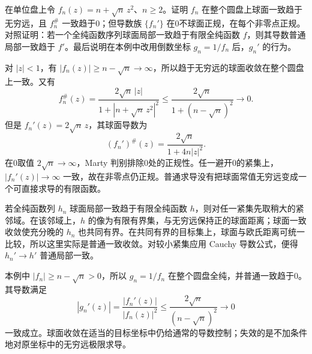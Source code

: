 \begin{exercise}[球面正规性不随求导保持]\label{b3:ex:14-8}
在单位盘上令 \(f_n(z)=n+\sqrt n\,z^2\)、\(n\ge2\)。证明 \(f_n\) 在整个圆盘上球面一致趋于无穷远，且 \(f_n^\#\) 一致趋于0；但导数族 \(\{f_n'\}\) 在0不球面正规，在每个非零点正规。对照证明：若一个全纯函数序列球面局部一致趋于有限全纯函数 \(f\)，则其导数普通局部一致趋于 \(f'\)。最后说明在本例中改用倒数坐标 \(g_n=1/f_n\) 后，\(g_n'\) 的行为。
\end{exercise}
\begin{solution}
对 \(|z|<1\)，有 \(|f_n(z)|\ge n-\sqrt n\rightarrow\infty\)，所以趋于无穷远的球面收敛在整个圆盘上一致。又有
\[
 f_n^\#(z)=\frac{2\sqrt n\,|z|}{1+|n+\sqrt n\,z^2|^2}
 \le\frac{2\sqrt n}{1+(n-\sqrt n)^2}\longrightarrow0.
\]
但是 \(f_n'(z)=2\sqrt n\,z\)，其球面导数为
\[
 (f_n')^\#(z)=\frac{2\sqrt n}{1+4n|z|^2}.
\]
在0取值 \(2\sqrt n\rightarrow\infty\)，Marty 判别排除0处的正规性。任一避开0的紧集上，\(|f_n'(z)|\rightarrow\infty\) 一致，故在非零点仍正规。普通求导没有把球面常值无穷远变成一个可直接求导的有限函数。

若全纯函数列 \(h_n\) 球面局部一致趋于有限全纯函数 \(h\)，则对任一紧集先取稍大的紧邻域。在该邻域上，\(h\) 的像为有限有界集，与无穷远保持正的球面距离；球面一致收敛使充分晚的 \(h_n\) 也共同有界。在共同有界的目标集上，球面与欧氏距离可统一比较，所以这里实际是普通一致收敛。对较小紧集应用 Cauchy 导数公式，便得 \(h_n'\rightarrow h'\) 普通局部一致。

本例中 \(|f_n|\ge n-\sqrt n>0\)，所以 \(g_n=1/f_n\) 在整个圆盘全纯，并普通一致趋于0。其导数满足
\[
 |g_n'(z)|=\frac{|f_n'(z)|}{|f_n(z)|^2}
 \le\frac{2\sqrt n}{(n-\sqrt n)^2}\longrightarrow0
\]
一致成立。球面收敛在适当的目标坐标中仍给通常的导数控制；失效的是不加条件地对原坐标中的无穷远极限求导。
\end{solution}
